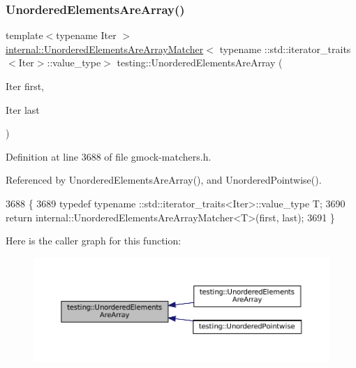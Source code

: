 \subsubsection{\texorpdfstring{Unordered\+Elements\+Are\+Array()}{UnorderedElementsAreArray()}\hspace{0.1cm}{\footnotesize\ttfamily [1/4]}}
{\footnotesize\ttfamily template$<$typename Iter $>$ \\
\hyperlink{classtesting_1_1internal_1_1UnorderedElementsAreArrayMatcher}{internal\+::\+Unordered\+Elements\+Are\+Array\+Matcher}$<$ typename \+::std\+::iterator\+\_\+traits$<$Iter$>$\+::value\+\_\+type$>$ testing\+::\+Unordered\+Elements\+Are\+Array (\begin{DoxyParamCaption}\item[{Iter}]{first,  }\item[{Iter}]{last }\end{DoxyParamCaption})\hspace{0.3cm}{\ttfamily [inline]}}



Definition at line 3688 of file gmock-\/matchers.\+h.



Referenced by Unordered\+Elements\+Are\+Array(), and Unordered\+Pointwise().


\begin{DoxyCode}
3688                                                  \{
3689   \textcolor{keyword}{typedef} typename ::std::iterator\_traits<Iter>::value\_type T;
3690   \textcolor{keywordflow}{return} internal::UnorderedElementsAreArrayMatcher<T>(first, last);
3691 \}
\end{DoxyCode}
Here is the caller graph for this function\+:
\nopagebreak
\begin{figure}[H]
\begin{center}
\leavevmode
\includegraphics[width=350pt]{namespacetesting_ab4896081406209171a1596b7028e1cf7_icgraph}
\end{center}
\end{figure}
\mbox{\label{namespacetesting_a99b9509a7cd405be28bf45231577384b}} 

